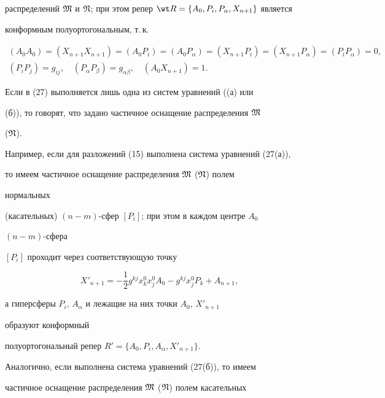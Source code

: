 распределений $\frak M$ и $\frak N$; при этом репер $\wt 


R=\{A_0,P_i,P_\alpha,X_{n+1}\}$ является 


конформным полуортогональным, т.\,к. 


\begin{gather*} 


(A_0A_0)=(X_{n+1}X_{n+1})=(A_0P_i)= 


(A_0P_\alpha)=(X_{n+1}P_i)= 


(X_{n+1}P_\alpha)=(P_i P_\alpha)=0, \\ 


(P_i P_j)=g_{ij},\quad (P_\alpha P_\beta)=g_{\alpha\beta},\quad 


(A_0X_{n+1})=1. 


\end{gather*} 


 


Если в (27) выполняется лишь одна из систем уравнений ((а) или 


(б)), то говорят, что задано частичное оснащение распределения $\frak M$ 


($\frak N$). 


Например, если для разложений (15) выполнена система уравнений (27(а)), 


то имеем частичное оснащение распределения $\frak M$ ($\frak N$) полем 


нормальных 


(касательных) $(n-m)$-сфер $[P_i]$; при этом в каждом центре $A_0$\; 


$(n-m)$-сфера 


$[P_i]$ проходит через соответствующую точку 


$$ 


X'_{n+1}=-\frac{1}{2}g^{k j}x^0_k x^0_j A_0- 


g^{k j}x^0_j P_k+A_{n+1}, 


$$ 


а гиперсферы $P_i$, $A_\alpha$ и лежащие на них точки $A_0$, $X'_{n+1}$ 


образуют конформный 


полуортогональный репер $R'=\{A_0,P_i,A_\alpha,X'_{n+1}\}$. 


 


Аналогично, если выполнена система уравнений (27(б)), то имеем 


частичное оснащение распределения $\frak M$ ($\frak N$) полем касательных 


